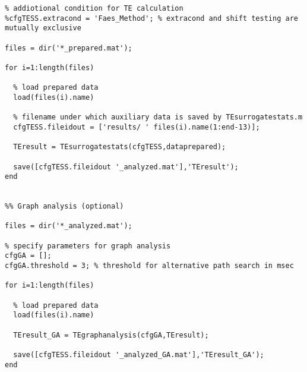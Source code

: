 \begin{lstlisting}
% addiotional condition for TE calculation
%cfgTESS.extracond = 'Faes_Method';	% extracond and shift testing are mutually exclusive

files = dir('*_prepared.mat');

for i=1:length(files)
  
  % load prepared data
  load(files(i).name)
  
  % filename under which auxiliary data is saved by TEsurrogatestats.m
  cfgTESS.fileidout = ['results/ ' files(i).name(1:end-13)];
  
  TEresult = TEsurrogatestats(cfgTESS,dataprepared);
  
  save([cfgTESS.fileidout '_analyzed.mat'],'TEresult');
end  


%% Graph analysis (optional) 

files = dir('*_analyzed.mat');

% specify parameters for graph analysis
cfgGA = [];
cfgGA.threshold = 3; % threshold for alternative path search in msec

for i=1:length(files)
  
  % load prepared data
  load(files(i).name)
  
  TEresult_GA = TEgraphanalysis(cfgGA,TEresult);
  
  save([cfgTESS.fileidout '_analyzed_GA.mat'],'TEresult_GA');
end  
\end{lstlisting}